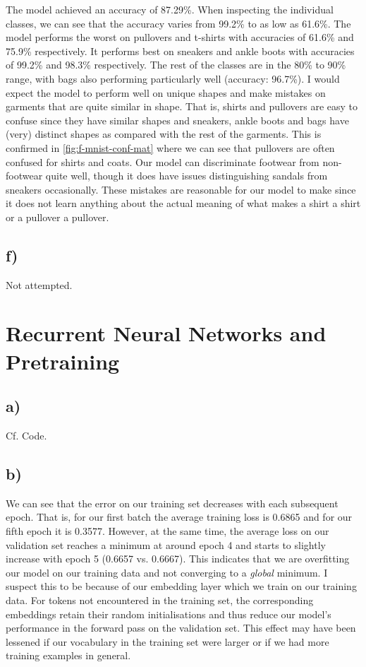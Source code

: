 \documentclass[11pt]{article}
\begin{document}
\noindent The model achieved an accuracy of 87.29\%. When inspecting the individual classes, we can see that the accuracy varies from 99.2\% to as low as 61.6\%. The model performs the worst on pullovers and t-shirts with accuracies of 61.6\% and 75.9\% respectively. It performs best on sneakers and ankle boots with accuracies of 99.2\% and 98.3\% respectively. The rest of the classes are in the 80\% to 90\% range, with bags also performing particularly well (accuracy: 96.7\%). I would expect the model to perform well on unique shapes and make mistakes on garments that are quite similar in shape. That is, shirts and pullovers are easy to confuse since they have similar shapes and sneakers, ankle boots and bags have (very) distinct shapes as compared with the rest of the garments. This is confirmed in \autoref{fig:f-mnist-conf-mat} where we can see that pullovers are often confused for shirts and coats. Our model can discriminate footwear from non-footwear quite well, though it does have issues distinguishing sandals from sneakers occasionally. These mistakes are reasonable for our model to make since it does not learn anything about the actual meaning of what makes a shirt a shirt or a pullover a pullover. 


\subsection{f)}\label{subsec:cnn-f}
Not attempted.

\section{Recurrent Neural Networks and Pretraining}\label{sec:rnn}
\subsection{a)}\label{subsec:rnn-a}
Cf. Code.
\subsection{b)}\label{subsec:rnn-b}
We can see that the error on our training set decreases with each subsequent epoch. That is, for our first batch the average training loss is 0.6865 and for our fifth epoch it is 0.3577. However, at the same time, the average loss on our validation set reaches a minimum at around epoch 4 and starts to slightly increase with epoch 5 (0.6657 vs. 0.6667). This indicates that we are overfitting our model on our training data and not converging to a \textit{global} minimum. I suspect this to be because of our embedding layer which we train on our training data. For tokens not encountered in the training set, the corresponding embeddings retain their random initialisations and thus reduce our model's performance in the forward pass on the validation set. This effect may have been lessened if our vocabulary in the training set were larger or if we had more training examples in general. 
\end{document}
